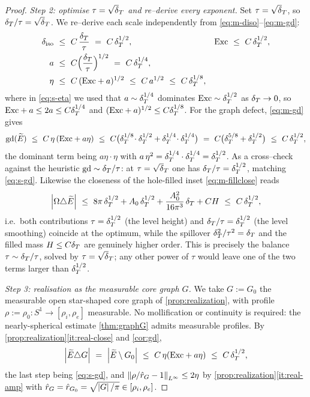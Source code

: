 \begin{proof}
\emph{Step 2: optimise $\tau=\sqrt\dT$ and re--derive every exponent.} Set
$\tau=\sqrt\dT$, so $\dT/\tau=\sqrt\dT$. We re--derive each scale
independently from \eqref{eq:m-diso}--\eqref{eq:m-gd}:
\begin{align}
   \diso\ &\le\ C\,\frac\dT\tau\ =\ C\,\dT^{1/2}, &
   \Exc\ &\le\ C\,\dT^{1/2}, \label{eq:s-diso}\\
   a\ &\le\ C\Bigl(\frac\dT\tau\Bigr)^{1/2}\ =\ C\,\dT^{1/4}, \label{eq:s-a}\\
   \eta\ &\le\ C\,(\Exc+a)^{1/2}\ \le\ C\,a^{1/2}\ \le\ C\,\dT^{1/8},
       \label{eq:s-eta}
\end{align}
where in \eqref{eq:s-eta} we used that $a\sim\delta_T^{1/4}$ dominates
$\mathrm{Exc}\sim\delta_T^{1/2}$ as $\delta_T\to0$, so $\mathrm{Exc}+a\le 2a\le C\delta_T^{1/4}$ and
$(\mathrm{Exc}+a)^{1/2}\le C\delta_T^{1/8}$. For the graph defect, \eqref{eq:m-gd} gives
\begin{equation}\label{eq:s-gd}
   \gd(\Etil)\ \le\ C\,\eta\,(\Exc+a\eta)
   \ \le\ C\bigl(\dT^{1/8}\!\cdot\dT^{1/2}+\dT^{1/4}\!\cdot\dT^{1/4}\bigr)
   \ =\ C\bigl(\dT^{5/8}+\dT^{1/2}\bigr)\ \le\ C\,\dT^{1/2},
\end{equation}
the dominant term being $a\eta\cdot\eta$ with
$a\,\eta^2=\delta_T^{1/4}\cdot\delta_T^{1/4}=\delta_T^{1/2}$. As a cross--check against the
heuristic $\mathrm{gd}\sim\delta_T/\tau$: at $\tau=\sqrt\dT$ one has
$\delta_T/\tau=\delta_T^{1/2}$, matching \eqref{eq:s-gd}. Likewise the closeness of the
hole-filled inset \eqref{eq:m-fillclose} reads
\begin{equation}\label{eq:s-close}
   \left\lvert\Omega\triangle\widetilde{E}\right\rvert\ \le\ 8\pi\,\delta_T^{1/2}+A_0\,\delta_T^{1/2}
       +\frac{A_0^2}{16\pi^3}\,\delta_T+CH\ \le\ C\,\delta_T^{1/2},
\end{equation}
i.e.\ both contributions $\tau=\delta_T^{1/2}$ (the level height) and
$\delta_T/\tau=\delta_T^{1/2}$ (the level smoothing) coincide at the optimum, while the
spillover $\delta_T^2/\tau^2=\delta_T$ and the filled mass $H\le C\delta_T$ are genuinely
higher order. This is precisely the
balance $\tau\sim\delta_T/\tau$, solved by $\tau=\sqrt\dT$; any other power of
$\tau$ would leave one of the two terms larger than $\delta_T^{1/2}$.

\emph{Step 3: realisation as the measurable core graph $G$.} We take $G:=G_0$
the measurable open star-shaped core graph of \cref{prop:realization}, with
profile $\rho:=\rho_0\colon S^1\to[\rho_i,\rho_e]$ measurable. No
mollification or continuity is required: the nearly-spherical estimate
\cref{thm:graphG} admits measurable profiles. By
\cref{prop:realization}\ref{it:real-close} and \cref{cor:gd},
\begin{equation}\label{eq:s-EtilG}
   \left\lvert\widetilde{E}\triangle G\right\rvert\ =\ \left\lvert\widetilde{E}\setminus G_0\right\rvert
   \ \le\ C\,\eta(\mathrm{Exc}+a\eta)\ \le\ C\,\delta_T^{1/2},
\end{equation}
the last step being \eqref{eq:s-gd}, and
$\left\lVert\rho/\hat r_G-1\right\rVert_{L^\infty}\le2\eta$ by
\cref{prop:realization}\ref{it:real-amp} with $\hat r_G=\hat r_{G_0}=
\sqrt{\left\lvert G\right\rvert/\pi}\in[\rho_i,\rho_e]$.


\end{proof}
